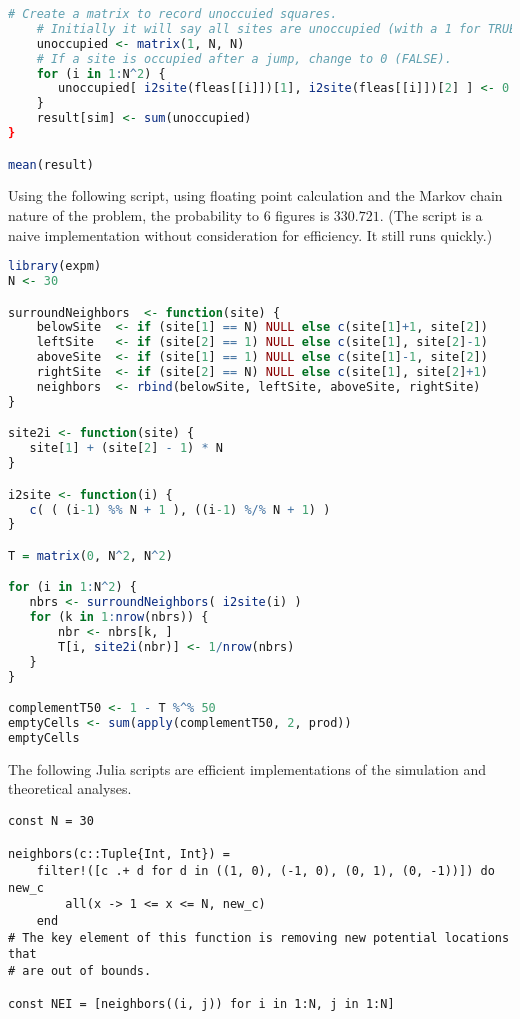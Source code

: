 \documentclass[12pt]{article}
\begin{document}
\begin{solution}
\begin{lstlisting}[language=R]
    # Create a matrix to record unoccuied squares.
    # Initially it will say all sites are unoccupied (with a 1 for TRUE).
    unoccupied <- matrix(1, N, N)
    # If a site is occupied after a jump, change to 0 (FALSE).
    for (i in 1:N^2) {
       unoccupied[ i2site(fleas[[i]])[1], i2site(fleas[[i]])[2] ] <- 0
    }
    result[sim] <- sum(unoccupied)
}

mean(result)
  \end{lstlisting}
  
  Using the following script, using floating point calculation and the
  Markov chain nature of the problem, the probability to \( 6 \)
  figures is \( 330.721 \).  (The script is a naive implementation
  without consideration for efficiency.  It still runs quickly.)

  \begin{lstlisting}[language=R]
library(expm)
N <- 30

surroundNeighbors  <- function(site) {
    belowSite  <- if (site[1] == N) NULL else c(site[1]+1, site[2])
    leftSite   <- if (site[2] == 1) NULL else c(site[1], site[2]-1)
    aboveSite  <- if (site[1] == 1) NULL else c(site[1]-1, site[2])
    rightSite  <- if (site[2] == N) NULL else c(site[1], site[2]+1)
    neighbors  <- rbind(belowSite, leftSite, aboveSite, rightSite)
}

site2i <- function(site) {
   site[1] + (site[2] - 1) * N
}

i2site <- function(i) {
   c( ( (i-1) %% N + 1 ), ((i-1) %/% N + 1) )
}

T = matrix(0, N^2, N^2)

for (i in 1:N^2) {
   nbrs <- surroundNeighbors( i2site(i) )
   for (k in 1:nrow(nbrs)) {
       nbr <- nbrs[k, ]
       T[i, site2i(nbr)] <- 1/nrow(nbrs)
   }
}

complementT50 <- 1 - T %^% 50
emptyCells <- sum(apply(complementT50, 2, prod))
emptyCells
  \end{lstlisting}

The following Julia scripts are efficient implementations of the
simulation and theoretical analyses.

\begin{lstlisting}
const N = 30

neighbors(c::Tuple{Int, Int}) =
    filter!([c .+ d for d in ((1, 0), (-1, 0), (0, 1), (0, -1))]) do new_c
        all(x -> 1 <= x <= N, new_c)
    end
# The key element of this function is removing new potential locations that
# are out of bounds.

const NEI = [neighbors((i, j)) for i in 1:N, j in 1:N]


\end{lstlisting}
\end{solution}
\end{document}
